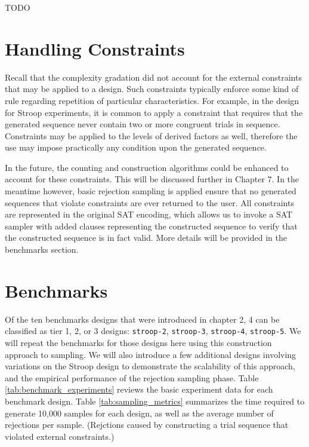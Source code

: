 TODO

\section{Handling Constraints}

Recall that the complexity gradation did not account for the external constraints that may be applied to a design. Such constraints typically enforce some kind of rule regarding repetition of particular characteristics. For example, in the design for Stroop experiments, it is common to apply a constraint that requires that the generated sequence never contain two or more congruent trials in sequence. Constraints may be applied to the levels of derived factors as well, therefore the use may impose practically any condition upon the generated sequence.

In the future, the counting and construction algorithms could be enhanced to account for these constraints. This will be discussed further in Chapter 7. In the meantime however, basic rejection sampling is applied ensure that no generated sequences that violate constraints are ever returned to the user. All constraints are represented in the original SAT encoding, which allows us to invoke a SAT sampler with added clauses representing the constructed sequence to verify that the constructed sequence is in fact valid. More details will be provided in the benchmarks section.


\section{Benchmarks}


Of the ten benchmarks designs that were introduced in chapter 2, 4 can be classified as tier 1, 2, or 3 designs: \texttt{stroop-2}, \texttt{stroop-3}, \texttt{stroop-4}, \texttt{stroop-5}. We will repeat the benchmarks for those designs here using this construction approach to sampling. We will also introduce a few additional designs involving variations on the Stroop design to demonstrate the scalability of this approach, and the empirical performance of the rejection sampling phase. Table \ref{tab:benchmark_experiments} reviews the basic experiment data for each benchmark design. Table \ref{tab:sampling_metrics} summarizes the time required to generate 10,000 samples for each design, as well as the average number of rejections per sample. (Rejctions caused by constructing a trial sequence that violated external constraints.)


